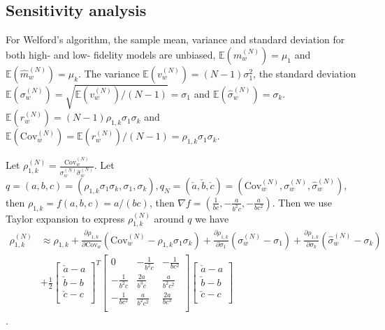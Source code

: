 \subsection{Sensitivity analysis}

For Welford's algorithm, the sample mean, variance and standard deviation for both high- and low- fidelity models are unbiased, $\mathbb{E}(m_w^{(N)})=\mu_1$ and $\mathbb{E}(\widehat m_w^{(N)})=\mu_k$. The variance $\mathbb{E}(v_w^{(N)})=(N-1)\sigma_1^2$, the standard deviation $\mathbb{E}(\sigma_w^{(N)})=\sqrt{\mathbb{E}(v_w^{(N)})/(N-1)}=\sigma_1$ and $\mathbb{E}(\widehat \sigma_w^{(N)})=\sigma_k$. $\mathbb{E}( r_w^{(N)})=(N-1)\rho_{1,k}\sigma_1\sigma_k$ and $\mathbb{E}(\text{Cov}_w^{(N)}) = \mathbb{E}( r_w^{(N)})/(N-1) = \rho_{1,k}\sigma_1\sigma_k$. 

Let $\rho_{1,k}^{(N)} = \frac{\text{Cov}_w^{(N)}}{\sigma_w^{(N)}\widehat\sigma_w^{(N)}}$. Let $q=(a,b,c)=(\rho_{1,k}\sigma_1\sigma_k,\sigma_1,\sigma_k), q_N=(\check{a},\check{b},\check{c})=(\text{Cov}_w^{(N)},\sigma_w^{(N)},\widehat\sigma_w^{(N)})$, then $\rho_{1,k} =f(a,b,c) = a/(bc)$, then $ \nabla f =(\frac{1}{bc}, -\frac{a}{b^2c}, -\frac{a}{bc^2})$. Then we use Taylor expansion to express $\rho_{1,k}^{(N)}$ around $q$ we have
\begin{align*}
    \rho_{1,k}^{(N)} &\approx \rho_{1,k} + \frac{\partial \rho_{1,k}}{\partial \text{Cov}_w}\left(\text{Cov}_w^{(N)} - \rho_{1,k}\sigma_1\sigma_k\right) + \frac{\partial \rho_{1,k}}{\partial \sigma_1}\left(\sigma_w^{(N)} - \sigma_1\right) + \frac{\partial \rho_{1,k}}{\partial \sigma_k}\left(\widehat \sigma_w^{(N)} - \sigma_k\right)\\
    &+ \frac 1 2 \begin{bmatrix}
        \check{a}-a\\
        \check{b}-b\\
        \check{c}-c\\
    \end{bmatrix}^T
    \begin{bmatrix}
        0&-\frac{1}{b^2c}&-\frac{1}{bc^2}\\
        -\frac{1}{b^2c}&\frac{2a}{b^3c}&\frac{a}{b^2c^2}\\
        -\frac{1}{bc^2}&\frac{a}{b^2c^2}&\frac{2a}{bc^3}\\
    \end{bmatrix}
    \begin{bmatrix}
        \check{a}-a\\
        \check{b}-b\\
        \check{c}-c\\
    \end{bmatrix}
\end{align*}.


